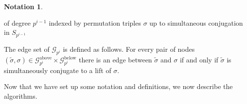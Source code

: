 \documentclass{dcthesis}
\newcommand{\PP}{\mathbb P}
\newcommand{\ZZ}{\mathbb Z}
\newcommand{\defi}[1]{\textsf{#1}}
\newcommand{\wt}[1]{\widetilde{#1}}
\numberwithin{equation}{section}
\newtheorem{lemma}[equation]{Lemma}
\theoremstyle{definition}
\newtheorem{definition}[equation]{Definition}
\newtheorem{notation}[equation]{Notation}
\theoremstyle{remark}
\begin{document}
{{{\begin{notation}
\begin{itemize}
          of degree $p^{i-1}$ indexed
          by permutation triples $\sigma$
          up to simultaneous conjugation
          in $S_{p^{i-1}}$
      \end{itemize}
      The edge set of
      $\mathscr{G}_{p^i}$ is defined as follows.
      For every pair of nodes
      $(\wt{\sigma},\sigma)\in
      \mathscr{G}_{p^i}^\text{above}
      \times
      \mathscr{G}_{p^i}^\text{below}$
      there is an edge between
      $\wt{\sigma}$
      and $\sigma$
      if and only if
      $\wt{\sigma}$ is simultaneously conjugate
      to a lift of $\sigma$.
    \end{notation}
    Now that we have set up some notation
    and definitions,
    we now describe the algorithms.
}}}
\end{document}
